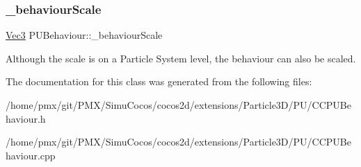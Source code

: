 \subsubsection{\texorpdfstring{\+\_\+behaviour\+Scale}{\_behaviourScale}}
{\footnotesize\ttfamily \hyperlink{classVec3}{Vec3} P\+U\+Behaviour\+::\+\_\+behaviour\+Scale\hspace{0.3cm}{\ttfamily [protected]}}

Although the scale is on a Particle System level, the behaviour can also be scaled. 

The documentation for this class was generated from the following files\+:\begin{DoxyCompactItemize}
\item 
/home/pmx/git/\+P\+M\+X/\+Simu\+Cocos/cocos2d/extensions/\+Particle3\+D/\+P\+U/C\+C\+P\+U\+Behaviour.\+h\item 
/home/pmx/git/\+P\+M\+X/\+Simu\+Cocos/cocos2d/extensions/\+Particle3\+D/\+P\+U/C\+C\+P\+U\+Behaviour.\+cpp\end{DoxyCompactItemize}
